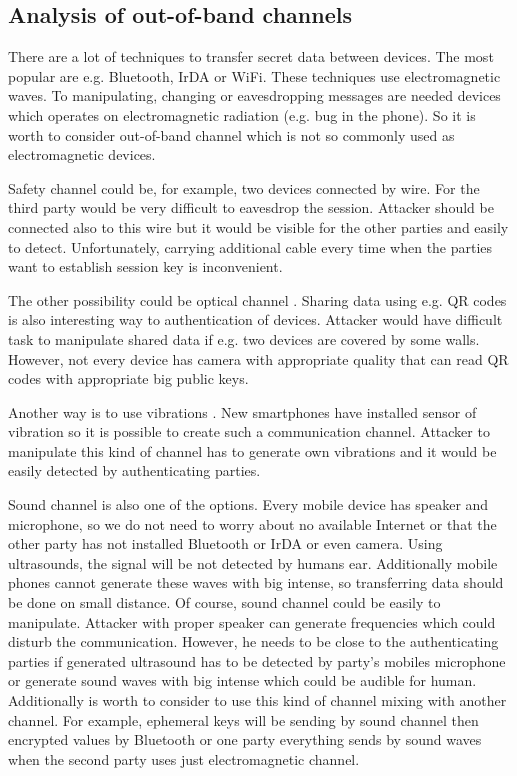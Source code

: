 \documentclass[11pt,titlepage]{article}
\theoremstyle{plain}
\begin{document}
\subsection{Analysis of out-of-band channels}
There are a lot of techniques to transfer secret data between devices. The most popular are e.g. Bluetooth, IrDA or WiFi. These techniques use electromagnetic waves. To manipulating, changing or eavesdropping messages are needed devices which operates on electromagnetic radiation (e.g. bug in the phone). So it is worth to consider out-of-band channel which is not so commonly used as electromagnetic devices.

\vspace{5mm}

Safety channel could be, for example, two devices connected by wire. For the third party would be very difficult to eavesdrop the session. Attacker should be connected also to this wire but it would be visible for the other parties and easily to detect. Unfortunately, carrying additional cable every time when the parties want to establish session key is inconvenient.

\vspace{5mm}

The other possibility could be optical channel \cite{QRcode}. Sharing data using e.g. QR codes is also interesting way to authentication of devices. Attacker would have difficult task to manipulate shared data if e.g. two devices are covered by some walls. However, not every device has camera with appropriate quality that can read QR codes with appropriate big public keys.

\vspace{5mm}

Another way is to use vibrations \cite{vibrat}. New smartphones have installed sensor of vibration so it is possible to create such a communication channel. Attacker to manipulate this kind of channel has to generate own vibrations and it would be easily detected by authenticating parties.

\vspace{5mm}

Sound channel is also one of the options. Every mobile device has speaker and microphone, so we do not need to worry about no available Internet or that the other party has not installed Bluetooth or IrDA or even camera. Using ultrasounds, the signal will be not detected by humans ear. Additionally mobile phones cannot generate these waves with big intense, so transferring data should be done on small distance. Of course, sound channel could be easily to manipulate. Attacker with proper speaker can generate frequencies which could disturb the communication. However, he needs to be close to the authenticating parties if generated ultrasound has to be detected by party's mobiles microphone or generate sound waves with big intense which could be audible for human. Additionally is worth to consider to use this kind of channel mixing with another channel. For example, ephemeral keys will be sending by sound channel then encrypted values by Bluetooth or one party everything sends by sound waves when the second party uses just electromagnetic channel.
\end{document}
